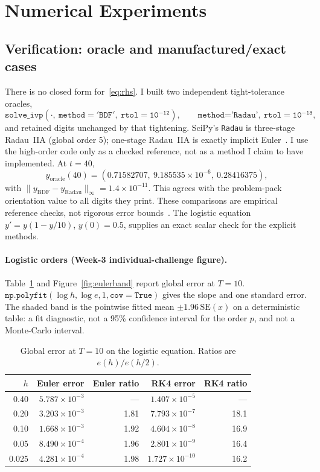 \documentclass[11pt,a4paper]{article}
\begin{document}
\section{Numerical Experiments}
\label{sec:exp}
\subsection{Verification: oracle and manufactured/exact cases}
\label{sec:oracle}
There is no closed form for~\eqref{eq:rhs}. I built two independent tight-tolerance oracles,
\[
\texttt{solve\_ivp}(\cdot,\ \mathtt{method='BDF'},\ \mathtt{rtol=10^{-12}}),\qquad
\texttt{method='Radau'},\ \mathtt{rtol=10^{-13}},
\]
and retained digits unchanged by that tightening. SciPy's \texttt{Radau} is three-stage Radau~IIA (global order 5); one-stage Radau~IIA is exactly implicit Euler~\cite{radauhandout}. I use the high-order code only as a checked reference, not as a method I claim to have implemented. At \(t=40\),
\begin{equation}
y_{\mathrm{oracle}}(40)=(0.71582707,\ 9.185535\times 10^{-6},\ 0.28416375),
\end{equation}
with \(\|y_{\mathrm{BDF}}-y_{\mathrm{Radau}}\|_\infty=1.4\times 10^{-11}\). This agrees with the problem-pack orientation value to all digits they print. These comparisons are empirical reference checks, not rigorous error bounds~\cite{tutorial3supp}. The logistic equation \(y'=y(1-y/10)\), \(y(0)=0.5\), supplies an exact scalar check for the explicit methods.

\paragraph{Logistic orders (Week-3 individual-challenge figure).}
Table~\ref{tab:log} and Figure~\ref{fig:eulerband} report global error at \(T=10\). \(\mathtt{np.polyfit}(\log h,\log e,1,\mathtt{cov=True})\) gives the slope and one standard error. The shaded band is the pointwise fitted mean \(\pm 1.96\,\mathrm{SE}(x)\) on a deterministic table: a fit diagnostic, not a 95\% confidence interval for the order \(p\), and not a Monte-Carlo interval.

\begin{table}[ht]
\centering
\caption{Global error at \(T=10\) on the logistic equation. Ratios are \(e(h)/e(h/2)\).}
\label{tab:log}
\begin{tabular}{@{}rrrrr@{}}
\toprule
\(h\) & Euler error & Euler ratio & RK4 error & RK4 ratio\\
\midrule
0.40 & \(5.787\times 10^{-3}\) & --- & \(1.407\times 10^{-5}\) & ---\\
0.20 & \(3.203\times 10^{-3}\) & 1.81 & \(7.793\times 10^{-7}\) & 18.1\\
0.10 & \(1.668\times 10^{-3}\) & 1.92 & \(4.604\times 10^{-8}\) & 16.9\\
0.05 & \(8.490\times 10^{-4}\) & 1.96 & \(2.801\times 10^{-9}\) & 16.4\\
0.025 & \(4.281\times 10^{-4}\) & 1.98 & \(1.727\times 10^{-10}\) & 16.2\\
\bottomrule
\end{tabular}
\end{table}
\end{document}
